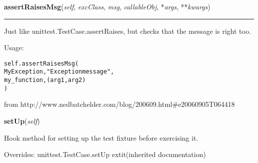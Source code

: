     \label{cssutils:tests:basetest:BaseTestCase:assertRaisesMsg}

    \vspace{0.5ex}

\hspace{.8\funcindent}\begin{boxedminipage}{\funcwidth}

    \raggedright \textbf{assertRaisesMsg}(\textit{self}, \textit{excClass}, \textit{msg}, \textit{callableObj}, *\textit{args}, **\textit{kwargs})

    \vspace{-1.5ex}

    \rule{\textwidth}{0.5\fboxrule}
\setlength{\parskip}{2ex}
    Just like unittest.TestCase.assertRaises, but checks that the message 
    is right too.

    Usage:

\begin{alltt}
   self.assertRaisesMsg(
       MyException, "Exception message",
       my\_function, (arg1, arg2)
       )\end{alltt}

    from http://www.nedbatchelder.com/blog/200609.html\#e20060905T064418

\setlength{\parskip}{1ex}
    \end{boxedminipage}

    \vspace{0.5ex}

\hspace{.8\funcindent}\begin{boxedminipage}{\funcwidth}

    \raggedright \textbf{setUp}(\textit{self})

\setlength{\parskip}{2ex}
    Hook method for setting up the test fixture before exercising it.

\setlength{\parskip}{1ex}
      Overrides: unittest.TestCase.setUp 	extit{(inherited documentation)}

    \end{boxedminipage}

    \label{cssutils:tests:basetest:BaseTestCase:do_equal_p}

